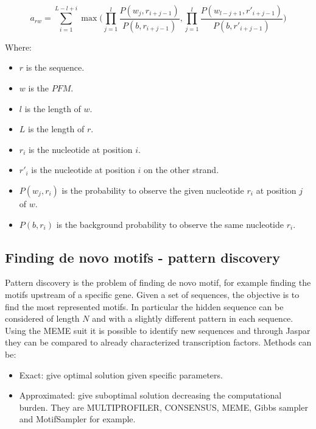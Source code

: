 		$$a_{rw} = \sum\limits_{i=1}^{L-l+i}\max\bigg(\prod\limits_{j=1}^l \frac{P(w_j, r_{i+j-1})}{P(b, r_{i+j-1})}, \prod\limits_{j=1}^l\frac{P(w_{l-j+1}, r'_{i+j-1})}{P(b, r'_{i+j-1})}\bigg)$$

		Where:

		\begin{multicols}{2}
			\begin{itemize}
				\item $r$ is the sequence.
				\item $w$ is the $PFM$.
				\item $l$ is the length of $w$.
				\item $L$ is the length of $r$.
				\item $r_i$ is the nucleotide at position $i$.
				\item $r'_i$ is the nucleotide at position $i$ on the other strand.
				\item $P(w_j, r_i)$ is the probability to observe the given nucleotide $r_i$ at position $j$ of $w$.
				\item $P(b, r_i)$ is the background probability to observe the same nucleotide $r_i$.
			\end{itemize}
		\end{multicols}

	\subsection{Finding de novo motifs - pattern discovery}
	Pattern discovery is the problem of finding de novo motif, for example finding the motifs upstream of a specific gene.
	Given a set of sequences, the objective is to find the most represented motifs.
	In particular the hidden sequence can be considered of length $N$ and with a slightly different pattern in each sequence.
	Using the MEME suit it is possible to identify new sequences and through Jaspar they can be compared to already characterized transcription factors.
	Methods can be:

	\begin{multicols}{2}
		\begin{itemize}
			\item Exact: give optimal solution given specific parameters.
			\item Approximated: give suboptimal solution decreasing the computational burden.
				They are MULTIPROFILER, CONSENSUS, MEME, Gibbs sampler and MotifSampler for example.
		\end{itemize}
	\end{multicols}

